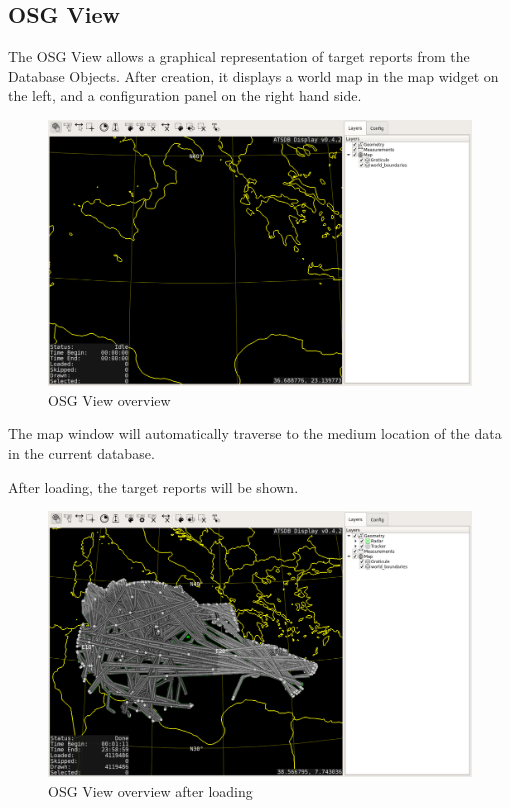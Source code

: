\subsection{OSG View}
\label{sec:osgview}

The OSG View allows a graphical representation of target reports from the Database Objects. After creation, it displays a world map in the map widget on the left, and a configuration panel on the right hand side.

\begin{figure}[H]
    \hspace*{-2cm}
    \includegraphics[width=18cm,frame]{../screenshots/osgview_overview.png}
  \caption{OSG View overview}
  \label{fig:osgview_overview}
\end{figure}

The map window will automatically traverse to the medium location of the data in the current database.

After loading, the target reports will be shown.

\begin{figure}[H]
    \hspace*{-2cm}
    \includegraphics[width=18cm,frame]{../screenshots/osgview_overview_loaded.png}
  \caption{OSG View overview after loading}
\end{figure}

